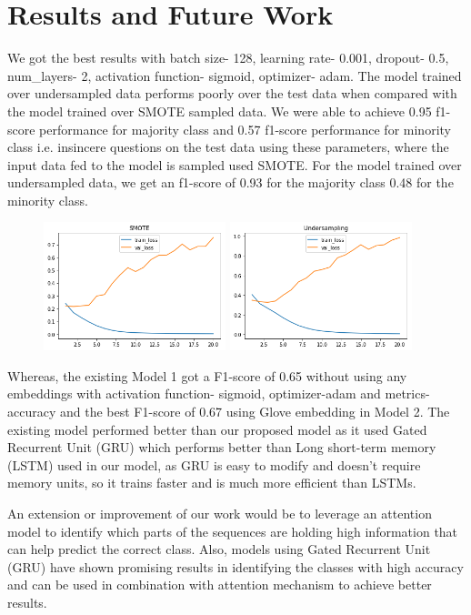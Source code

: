 \section{Results and Future Work}
We got the best results with batch size- 128, learning rate- 0.001, dropout- 0.5, num\_layers- 2, activation function- sigmoid, optimizer- adam. The model trained over undersampled data performs poorly over the test data when compared with the model trained over SMOTE sampled data. We were able to achieve 0.95 f1- score performance for majority class and 0.57 f1-score performance for minority class i.e. insincere questions on the test data using these parameters, where the input data fed to the model is sampled used SMOTE.  For the model trained over undersampled data, we get an f1-score of 0.93 for the majority class 0.48 for the minority class.
\begin{figure}[h]
	\begin{center}
		\includegraphics[width=150pt]{figures/smote.png}
		\includegraphics[width=150pt]{figures/undersampling.png}
		\label{fig:Model Performance over SMOTE}
	\end{center}
\end{figure}

Whereas, the existing Model 1 got a F1-score of 0.65 without using any embeddings with activation function- sigmoid, optimizer-adam and metrics- accuracy and the best F1-score of 0.67 using Glove embedding in Model 2. The existing model performed better than our proposed model as it used Gated Recurrent Unit (GRU) which performs better than Long short-term memory (LSTM) used in our model, as GRU is easy to modify and doesn't require memory units, so it trains faster and is much more efficient than LSTMs.

An extension or improvement of our work would be to leverage an attention model to identify which parts of the sequences are holding high information that can help predict the correct class. Also, models using Gated Recurrent Unit (GRU) have shown promising results in identifying the classes with high accuracy and can be used in combination with attention mechanism to achieve better results. 